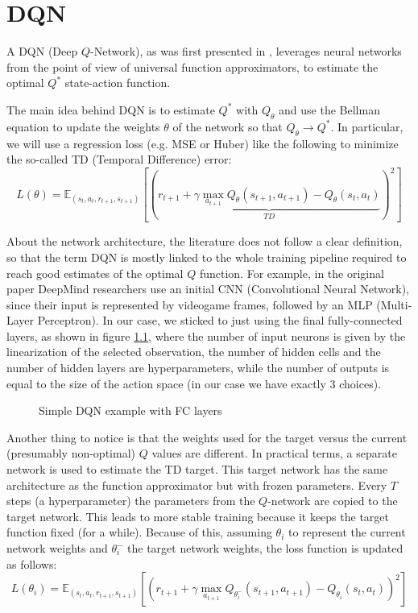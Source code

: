 \documentclass[a4paper,10pt]{report}
\begin{document}
\chapter{DQN}
A DQN (Deep $Q$-Network), as was first presented in \cite{atari-dqn}, leverages neural networks from the point of view of universal function approximators, to estimate the optimal $Q^*$ state-action function. 

The main idea behind DQN is to estimate $Q^*$ with $Q_\theta$ and use the Bellman equation to update the weights $\theta$ of the network so that $Q_\theta\rightarrow Q^*$. In particular, we will use a regression loss (e.g. MSE or Huber) like the following to minimize the so-called TD (Temporal Difference) error:
$$
L(\theta)=\mathbb{E}_{(s_t,a_t,r_{t+1},s_{t+1})}\left[\left(\underbrace{r_{t+1}+\gamma\max_{a_{t+1}}Q_\theta(s_{t+1}, a_{t+1}) - Q_\theta(s_t, a_t)}_{TD}\right)^2\right]
$$

About the network architecture, the literature does not follow a clear definition, so that the term DQN is mostly linked to the whole training pipeline required to reach good estimates of the optimal $Q$ function. For example, in the original paper \cite{atari-dqn} DeepMind researchers use an initial CNN (Convolutional Neural Network), since their input is represented by videogame frames, followed by an MLP (Multi-Layer Perceptron). In our case, we sticked to just using the final fully-connected layers, as shown in figure \ref{fig:fc-dqn}, where the number of input neurons is given by the linearization of the selected observation, the number of hidden cells and the number of hidden layers are hyperparameters, while the number of outputs is equal to the size of the action space (in our case we have exactly $3$ choices). 

\begin{figure}[h]
	\centering
	
	\caption{Simple DQN example with FC layers}
	\label{fig:fc-dqn}
\end{figure}

Another thing to notice is that the weights used for the target versus the current (presumably non-optimal) $Q$ values are different. In practical terms, a separate network is used to estimate the TD target. This target network has the same architecture as the function approximator but with frozen parameters. Every $T$ steps (a hyperparameter) the parameters from the $Q$-network are copied to the target network. This leads to more stable training because it keeps the target function fixed (for a while). Because of this, assuming $\theta_i$ to represent the current network weights and $\theta_i^{-}$ the target network weights, the loss function is updated as follows:
$$
L(\theta_i)=\mathbb{E}_{(s_t,a_t,r_{t+1},s_{t+1})}\left[\left(r_{t+1}+\gamma\max_{a_{t+1}}Q_{\theta_i^{-}}(s_{t+1}, a_{t+1}) - Q_{\theta_i}(s_t, a_t)\right)^2\right]
$$
\end{document}
